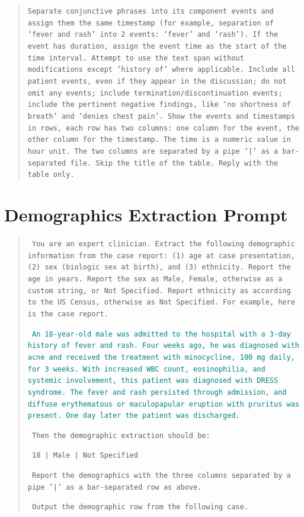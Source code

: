 \documentclass[pmlr]{jmlr}%
\begin{document}
\begin{quote}
\noindent \texttt{Separate conjunctive phrases into its component events and assign them the same timestamp (for example, separation of ‘fever and rash’ into 2 events: ‘fever’ and ‘rash’). If the event has duration, assign the event time as the start of the time interval. Attempt to use the text span without modifications except ‘history of’ where applicable. Include all patient events, even if they appear in the discussion; do not omit any events; include termination/discontinuation events; include the pertinent negative findings, like ‘no shortness of breath’ and ‘denies chest pain’. Show the events and timestamps in rows, each row has two columns: one column for the event, the other column for the timestamp. The time is a numeric value in hour unit. The two columns are separated by a pipe ‘|’ as a bar-separated file. Skip the title of the table. Reply with the table only.}
\end{quote}

\clearpage
\section{Demographics Extraction Prompt}
\label{apd:demographics_prompt}
\begin{quote}
\noindent
\texttt{
You are an expert clinician. Extract the following demographic information from the case report: (1) age at case presentation, (2) sex (biologic sex at birth), and (3) ethnicity.  Report the age in years.  Report the sex as Male, Female, otherwise as a custom string, or Not Specified.  Report ethnicity as according to the US Census, otherwise as Not Specified.  For example, here is the case report.}
    
\textcolor{teal}{\texttt{
An 18-year-old male was admitted to the hospital with a 3-day history of fever and rash. Four weeks ago, he was diagnosed with acne and received the treatment with minocycline, 100 mg daily, for 3 weeks. With increased WBC count, eosinophilia, and systemic involvement, this patient was diagnosed with DRESS syndrome. The fever and rash persisted through admission, and diffuse erythematous or maculopapular eruption with pruritus was present. One day later the patient was discharged.
}}
    
\texttt{
    Then the demographic extraction should be: 
}

\noindent\texttt{
    18 | Male | Not Specified
}
    
\noindent\texttt{
    Report the demographics with the three columns separated by a pipe '|' as a bar-separated row as above.
}
    
\texttt{
Output the demographic row from the following case.
}
\end{quote}
\end{document}
